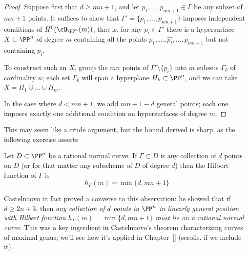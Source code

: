\begin{proof}
Suppose first that $d \geq mn+1$, and let $p_1,\dots,p_{mn+1} \in \Gamma$ be any subset of $mn+1$ points. It suffices to show that $\Gamma' = \{p_1,\dots,p_{mn+1}\}$ imposes independent conditions of $H^0(\cO_{\PP^n}(m))$, that is, for any $p_i \in \Gamma'$ there is a hypersurface $X \subset \PP^n$ of degree $m$ containing all the points $p_1,\dots, \hat{p_i},\dots,p_{mn+1}$ but not containing $p_i$.

To construct such an $X$, group the $mn$ points of $\Gamma' \setminus \{p_i\}$ into $m$ subsets $\Gamma_k$ of cardinality $n$; each set $\Gamma_k$ will span a hyperplane $H_k \subset \PP^n$, and we can take $X = H_1 \cup \dots \cup H_m$. 

In the case where $d<mn+1$, we add $mn+1-d$ general points; each one imposes exactly one
additional condition on hypersurfaces of degree $m$.
\end{proof}

This may seem like a crude argument, but the bound derived is sharp, as the following exercise asserts

\begin{exercise}
Let $D \subset \PP^n$ be a rational normal curve. If $\Gamma \subset D$ is any collection of $d$ points on $D$ (or for that matter any subscheme of $D$ of degree $d$) then the Hilbert function of $\Gamma$ is
$$
h_\Gamma(m) = \min\{d, mn+1\}
$$
\end{exercise} 

\begin{fact}
Castelnuovo in fact proved a converse to this observation: he showed that if $d \geq 2n+3$, then \emph{any collection of $d$ points in $\PP^n$ in linearly general position with Hilbert function $h_\Gamma(m) = \min\{d, mn+1\}$ must lie on a rational normal curve}. This was a key ingredient in Castelnuovo's theorem characterizing curves of maximal genus; we'll see how it's applied in Chapter~\ref{} (scrolls, if we include it).
\end{fact}


